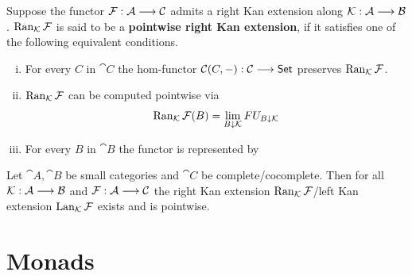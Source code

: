 	\begin{definition}
		Suppose the functor $\mathcal{F}:\mathcal{A} --> \mathcal{C}$ admits a right Kan extension along $\mathcal{K}:\mathcal{A} --> \mathcal{B}$. $\operatorname{Ran}_{\mathcal{K}}\mathcal{F}$ is said to be a \textbf{pointwise right Kan extension}, if it satisfies one of the following equivalent conditions.
		\begin{enumerate}[(i)]
			\item{
				For every $C$ in $\cat{C}$ the hom-functor $\mathcal{C}(C,-): \mathcal{C} --> \textsf{Set}$ preserves $\operatorname{Ran}_{\mathcal{K}}\mathcal{F}$.
			}
			\item{
				$\operatorname{Ran}_{\mathcal{K}}\mathcal{F}$ can be computed pointwise via
				\begin{align*}
					\operatorname{Ran}_{\mathcal{K}}\mathcal{F}(B) = \lim_{B \downarrow \mathcal{K}} FU_{B \downarrow \mathcal{K}}
				\end{align*}
			}
			\item{
				For every $B$ in $\cat{B}$ the functor  is represented by 
			}
		\end{enumerate}
	\end{definition}

	\begin{lemma}
		Let $\cat{A},\cat{B}$ be small categories and $\cat{C}$ be complete/cocomplete. Then for all $\mathcal{K}:\mathcal{A} --> \mathcal{B}$ and $\mathcal{F}:\mathcal{A}-->\mathcal{C}$ the right Kan extension $\operatorname{Ran}_{\mathcal{K}}\mathcal{F}$/left Kan extension $\operatorname{Lan}_{\mathcal{K}}\mathcal{F}$ exists and is pointwise.
	\end{lemma}

	\section{Monads}
